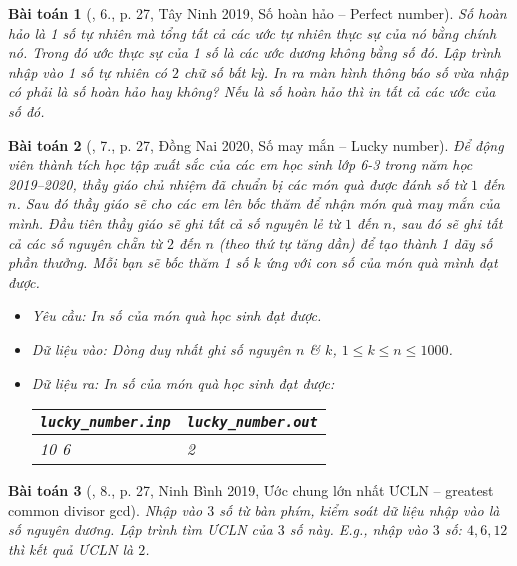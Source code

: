 \documentclass{article}
\newtheorem{baitoan}{Bài toán}
\begin{document}
\begin{baitoan}[\cite{VietSTEM2021}, 6., p. 27, Tây Ninh 2019, Số hoàn hảo -- Perfect number]
	\emph{Số hoàn hảo} là 1 số tự nhiên mà tổng tất cả các ước tự nhiên thực sự của nó bằng chính nó. Trong đó ước thực sự của 1 số là các ước dương không bằng số đó. Lập trình nhập vào 1 số tự nhiên có $2$ chữ số bất kỳ. In ra màn hình thông báo số vừa nhập có phải là số hoàn hảo hay không? Nếu là số hoàn hảo thì in tất cả các ước của số đó.
\end{baitoan}

\begin{baitoan}[\cite{VietSTEM2021}, 7., p. 27, Đồng Nai 2020, Số may mắn -- Lucky number]
	Để động viên thành tích học tập xuất sắc của các em học sinh lớp 6-3 trong năm học 2019--2020, thầy giáo chủ nhiệm đã chuẩn bị các món quà được đánh số từ $1$ đến $n$. Sau đó thầy giáo sẽ cho các em lên bốc thăm để nhận món quà may mắn của mình. Đầu tiên thầy giáo sẽ ghi tất cả số nguyên lẻ từ $1$ đến $n$, sau đó sẽ ghi tất cả các số nguyên chẵn từ $2$ đến $n$ (theo thứ tự tăng dần) để tạo thành 1 dãy số phần thưởng. Mỗi bạn sẽ bốc thăm 1 số $k$ ứng với con số của món quà mình đạt được.
	\begin{itemize}
		\item {\sf Yêu cầu:} In số của món quà học sinh đạt được.
		\item {\sf Dữ liệu vào:} Dòng duy nhất ghi số nguyên $n$ \& $k$, $1\le k\le n\le1000$.
		\item {\sf Dữ liệu ra:} In số của món quà học sinh đạt được:
		\begin{table}[H]
			\centering
			\begin{tabular}{|l|l|}
				\hline
				\verb|lucky_number.inp| & \verb|lucky_number.out| \\
				\hline
				10 6 & 2 \\
				\hline
			\end{tabular}
		\end{table}
	\end{itemize}
\end{baitoan}

\begin{baitoan}[\cite{VietSTEM2021}, 8., p. 27, Ninh Bình 2019, Ước chung lớn nhất ƯCLN -- greatest common divisor gcd]
	Nhập vào $3$ số từ bàn phím, kiểm soát dữ liệu nhập vào là số nguyên dương. Lập trình tìm \emph{ƯCLN} của $3$ số này. E.g., nhập vào $3$ số: $4,6,12$ thì kết quả \emph{ƯCLN} là $2$.
\end{baitoan}
\end{document}
